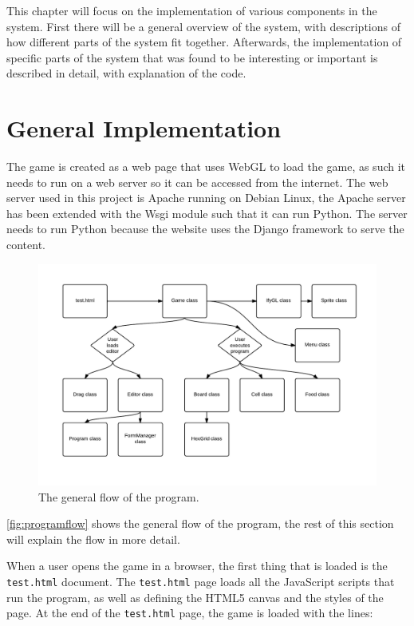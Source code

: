 This chapter will focus on the implementation of various components in the system. First there will be a general overview of the system, with descriptions of how different parts of the system fit together. Afterwards, the implementation of specific parts of the system that was found to be interesting or important is described in detail, with explanation of the code.

\section{General Implementation}
The game is created as a web page that uses WebGL to load the game, as such it needs to run on a web server so it can be accessed from the internet. The web server used in this project is Apache running on Debian Linux, the Apache server has been extended with the Wsgi module such that it can run Python. The server needs to run Python because the website uses the Django framework to serve the content.

\begin{figure}[h]
\includegraphics[width=\textwidth]{img/Program_flow.pdf}
\caption{The general flow of the program.}
\label{fig:programflow}
\end{figure}

\autoref{fig:programflow} shows the general flow of the program, the rest of this section will explain the flow in more detail.\newline

When a user opens the game in a browser, the first thing that is loaded is the \texttt{test.html} document. The \texttt{test.html} page loads all the JavaScript scripts that run the program, as well as defining the HTML5 canvas and the styles of the page. At the end of the \texttt{test.html} page, the game is loaded with the lines: 

